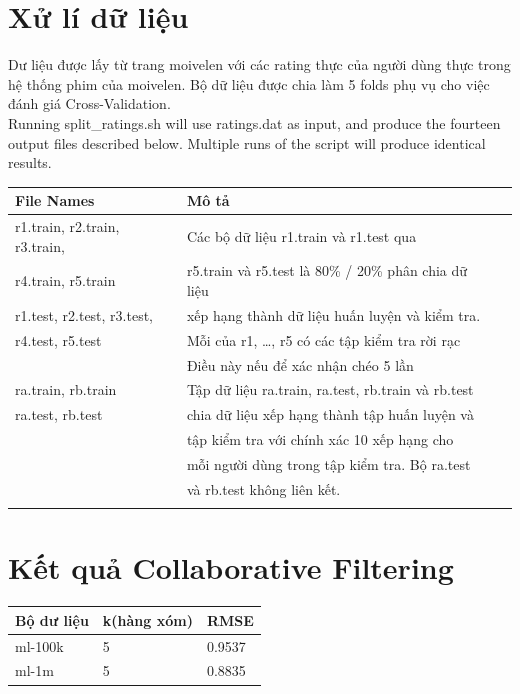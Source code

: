 \documentclass[a4paper,11pt]{report}
\begin{document}
\section{Xử lí dữ liệu}
Dư liệu được lấy từ  trang moivelen với các rating thực của người dùng thực trong hệ thống phim của moivelen. Bộ dữ liệu được chia làm 5 folds phụ vụ cho việc đánh giá Cross-Validation. \\
Running split\_ratings.sh will use ratings.dat as input, and produce the fourteen output files described below. Multiple runs of the script will produce identical results. \\
\begin{center}
\begin{longtable}{|l|l|l|} 
\hline
File Names & Mô tả  \\
\hline
r1.train, r2.train, r3.train, & Các bộ dữ liệu r1.train và r1.test qua \\
r4.train, r5.train &  r5.train và r5.test là 80\% / 20\% phân chia dữ liệu \\
r1.test, r2.test, r3.test, & xếp hạng thành dữ liệu huấn luyện và kiểm tra. \\
r4.test, r5.test & Mỗi của r1, \ldots, r5 có các tập kiểm tra rời rạc \\
& Điều này nếu để xác nhận chéo 5 lần \\
\hline
ra.train, rb.train & Tập dữ liệu ra.train, ra.test, rb.train và rb.test\\ 
ra.test, rb.test & chia dữ liệu xếp hạng thành tập huấn luyện và \\
				& tập kiểm tra với chính xác 10 xếp hạng cho\\
				&  mỗi người dùng trong tập kiểm tra. Bộ ra.test \\
				&  và rb.test không liên kết.\\
				& \\
				\hline
\end{longtable}
\end{center}
\section{Kết quả Collaborative Filtering}
\begin{center}
\begin{longtable}{|l|l|l|}
\hline
Bộ dư liệu & k(hàng xóm) & RMSE \\ 
\hline
ml-100k & 5 & 0.9537 \\
ml-1m & 5 & 0.8835 \\
\hline
\end{longtable}
\end{center}
\end{document}
